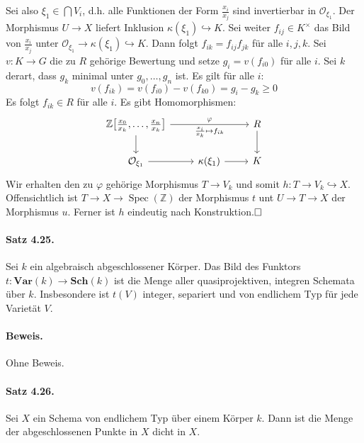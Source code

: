 \documentclass[11pt,b5paper,openany]{memoir}
\def \qed {$\hfill\square$}
\begin{document}
Sei also $\xi_1\in\bigcap V_i$, d.h. alle Funktionen der Form $\frac{x_i}{x_j}$ sind invertierbar in $\mathcal{O}_{\xi_1}$. Der Morphismus $U\to X$ liefert Inklusion $\kappa(\xi_1)\hookrightarrow K$. Sei weiter $f_{ij}\in K^\times$ das Bild von $\frac{x_i}{x_j}$ unter $\mathcal{O}_{\xi_1}\to \kappa(\xi_1)\hookrightarrow K$. Dann folgt $f_{ik}=f_{ij}f_{jk}$ für alle $i,j,k$. Sei $v:K\to G$ die zu $R$ gehörige Bewertung und setze $g_i=v(f_{i0})$ für alle $i$. Sei $k$ derart, dass $g_k$ minimal unter $g_0,\ldots,g_n$ ist. Es gilt für alle $i$:
\[v(f_{ik})=v(f_{i0})-v(f_{k0})=g_i-g_k\geq 0 \]
Es folgt $f_{ik}\in R$ für alle $i$. Es gibt Homomorphismen:
\[\begin{tikzcd}
\mathbb{Z}\big[\frac{x_0}{x_k},\ldots,\frac{x_n}{x_k}\big]\ar[rr, "\varphi", "\frac{x_i}{x_k}\mapsto f_{ik}"'] \ar[d]&& R\ar[d]\\
\mathcal{O}_{\xi_1}\ar[r] & \kappa(\xi_1)\ar[r] & K
\end{tikzcd}\]
Wir erhalten den zu $\varphi$ gehörige Morphismus $T\to V_k$ und somit $h:T\to V_k\hookrightarrow X$. Offensichtlich ist $T\to X\to\operatorname{Spec}(\mathbb{Z})$ der Morphismus $t$ unt $U\to T\to X$ der Morphismus $u$. Ferner ist $h$ eindeutig nach Konstruktion.\qed

\paragraph{Satz 4.25.}\label{4.25} Sei $k$ ein algebraisch abgeschlossener Körper. Das Bild des Funktors $t:\mathbf{Var}(k)\to \mathbf{Sch}(k)$ ist die Menge aller quasiprojektiven, integren Schemata über $k$. Insbesondere ist $t(V)$ integer, separiert und von endlichem Typ für jede Varietät $V$.

\paragraph{Beweis.} Ohne Beweis.

\paragraph{Satz 4.26.}\label{4.26} Sei $X$ ein Schema von endlichem Typ über einem Körper $k$. Dann ist die Menge der abgeschlossenen Punkte in $X$ dicht in $X$.

\iffalse
\paragraph{Beweis.} Es genügt die Aussage für affine Schemata zu zeigen. Sei $X=\operatorname{Spec}(A)$ mit einer endlich erzeugten $k$-Algebra $A$ und $\mathfrak{M}$ die Menge der abgeschlossenen Punkte von $\operatorname{Spec}(A)$. Sei $f\in A$ mit $D(f)\neq\varnothing$. Wir zeigen $\mathfrak{M}\cap D(f)\neq\varnothing$. Es ist $D(f)\cong\operatorname{Spec}(A_f)$. Es existiert ein abgeschlossener Punkt $y\in \operatorname{Spec}(A_f)$, d.h. ein Maximalideal in $A_f$. Nun ist $A_f=A\big[\frac{1}{f}\big]$ endlich erzeugt über $k$, also $\kappa(y)=A_f/y$ eine algebraische Erweiterung von $k$ nach dem Hilbertschen Nullstellensatz. Sei $x$ der zu $y$ gehörige Punkt in $D(f)$.
\fi
\end{document}
